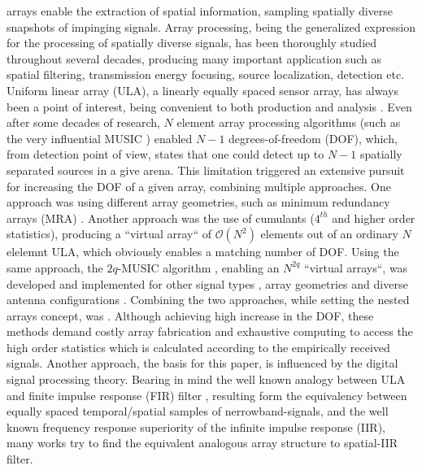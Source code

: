 arrays enable the extraction of spatial information, sampling spatially diverse snapshots of impinging signals. Array processing, being the generalized expression for the processing of spatially diverse signals, has been thoroughly studied throughout several decades, producing many important application such as spatial filtering, transmission energy focusing, source localization, detection etc. Uniform linear array (ULA), a linearly equally spaced sensor array, has always been a point of interest, being convenient to both production and analysis \cite{VanTrees2002DetectionIV}. Even after some decades of research, $N$ element array processing algorithms (such as the very influential MUSIC \cite{Ralph1986MultipleParameter}) enabled $N-1$ degrees-of-freedom (DOF), which, from detection point of view, states that one could detect up to $N-1$ spatially separated sources in a give arena. 
This limitation triggered an extensive pursuit for increasing the DOF of a given array, combining multiple approaches. 
One approach was using different array geometries, such as minimum redundancy arrays (MRA) \cite{Moffet1968Minimum-RedundancyArrays,Pillai1985AEstimation,UnnikrishnaPillai1987StatisticalMatrix}.  
Another approach was the use of cumulants \cite{Chevalier2005OnProcessing,Mendel1999ApplicationsProcessing,Chevalier1999OnProblemb} ($4^{th}$ and higher order statistics), producing a ``virtual array`` of $\mathcal{O}(N^{2})$ elements out of an ordinary $N$ elelemnt ULA, which obviously enables a matching number of DOF. Using the same approach, the $2q$-MUSIC algorithm \cite{Chevalier2006High-resolutionAlgorithm}, enabling an $N^{2q}$ ``virtual arrays``, was developed and implemented for other signal types \cite{Liu2008ExtendedSignals}, array geometries \cite{Pal2012MultipleProcessing} and diverse antenna configurations \cite{Chevalier2007HigherAlgorithms}.
Combining the two approaches, while setting the nested arrays concept, was \cite{Pal2010NestedFreedom}.
Although achieving high increase in the DOF, these methods demand costly array fabrication and exhaustive computing to access the high order statistics which is calculated according to the empirically received signals.
Another approach, the basis for this paper, is influenced by the digital signal processing theory. 
Bearing in mind the well known analogy between ULA and finite impulse response (FIR) filter \cite{VanVeenBeamforming:Filtering}, resulting form the equivalency between equally spaced temporal/spatial samples of nerrowband-signals, and the well known frequency response superiority of the infinite impulse response (IIR), many works try to find the equivalent analogous array structure to spatial-IIR filter.
